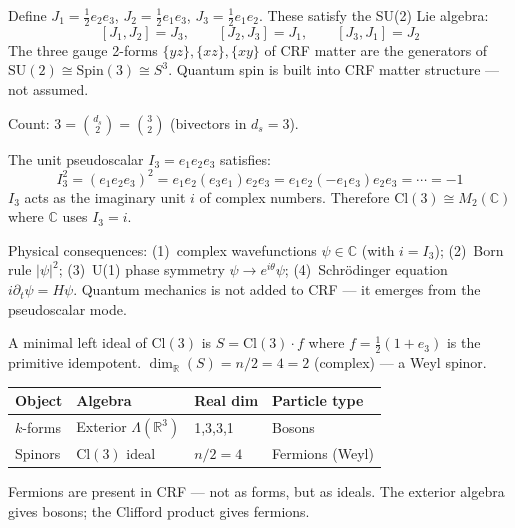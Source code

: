 \documentclass[12pt, a4paper]{article}
\begin{document}
\begin{derivedbox}[title={SU(2) from Bivectors --- Proved Algebraically}]
Define $J_1 = \frac{1}{2}e_2e_3$, $J_2 = \frac{1}{2}e_1e_3$, $J_3 = \frac{1}{2}e_1e_2$.
These satisfy the SU(2) Lie algebra:
\[
  [J_1,J_2] = J_3, \qquad [J_2,J_3] = J_1, \qquad [J_3,J_1] = J_2
\]
The three gauge 2-forms $\{yz\},\{xz\},\{xy\}$ of CRF matter are the generators of
$\mathrm{SU}(2) \cong \mathrm{Spin}(3) \cong S^3$. Quantum spin is built into CRF
matter structure --- not assumed.

Count: $3 = \binom{d_s}{2} = \binom{3}{2}$ (bivectors in $d_s=3$).
\end{derivedbox}

\begin{derivedbox}[title={$I_3^2 = -1$ --- Pseudoscalar as Imaginary Unit}]
The unit pseudoscalar $I_3 = e_1e_2e_3$ satisfies:
\[
  I_3^2 = (e_1e_2e_3)^2 = e_1e_2(e_3e_1)e_2e_3
  = e_1e_2(-e_1e_3)e_2e_3 = \cdots = -1
\]
$I_3$ acts as the imaginary unit $i$ of complex numbers. Therefore
$\mathrm{Cl}(3) \cong M_2(\mathbb{C})$ where $\mathbb{C}$ uses $I_3 = i$.

Physical consequences: (1)~complex wavefunctions $\psi\in\mathbb{C}$ (with $i=I_3$);
(2)~Born rule $|\psi|^2$; (3)~U(1) phase symmetry $\psi\to e^{i\theta}\psi$;
(4)~Schr\"{o}dinger equation $i\partial_t\psi = H\psi$. Quantum mechanics is not
added to CRF --- it emerges from the pseudoscalar mode.
\end{derivedbox}

\begin{derivedbox}[title={Fermions from Clifford Ideals}]
A minimal left ideal of $\mathrm{Cl}(3)$ is $S = \mathrm{Cl}(3)\cdot f$ where
$f = \frac{1}{2}(1+e_3)$ is the primitive idempotent.
$\dim_\mathbb{R}(S) = n/2 = 4 = 2$ (complex) --- a Weyl spinor.

\begin{center}
\renewcommand{\arraystretch}{1.2}
\begin{tabular}{p{2.5cm} p{4.0cm} p{2.0cm} p{3.5cm}}
\toprule
\textbf{Object} & \textbf{Algebra} & \textbf{Real dim} & \textbf{Particle type} \\
\midrule
$k$-forms & Exterior $\Lambda(\mathbb{R}^3)$ & 1,3,3,1 & Bosons \\
Spinors & $\mathrm{Cl}(3)$ ideal & $n/2=4$ & Fermions (Weyl) \\
\bottomrule
\end{tabular}
\end{center}

Fermions are present in CRF --- not as forms, but as ideals. The exterior algebra
gives bosons; the Clifford product gives fermions.
\end{derivedbox}
\end{document}

